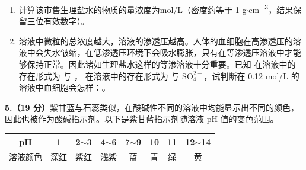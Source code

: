 \documentclass[11pt,a4paper]{article}
\begin{document}
\begin{enumerate}[label=（\arabic*）]
\item 计算该市售生理盐水的物质的量浓度为\blank[3.5em]mol/L（密度约等于 1 g$\cdot$cm\textsuperscript{$-$3}，结果保留三位有效数字）。

\item 溶液中微粒的总浓度越大，溶液的渗透压越高。人体的血细胞在高渗透压的溶液中会失水皱缩，在低渗透压环境下会吸水膨胀，只有在等渗透压溶液中才能够保持正常。因此诸如生理盐水这样的等渗溶液十分重要。已知  在溶液中的存在形式为  与 ， 在溶液中的存在形式为  与 $\mathrm{SO_4^{2-}}$，试判断在 0.12 mol/L 的  溶液中血细胞会怎样：\blank[3em]。
\end{enumerate}


\noindent\textbf{5.（19 分）}紫甘蓝与石蕊类似，在酸碱性不同的溶液中均能显示出不同的颜色，因此也被作为酸碱指示剂。以下是紫甘蓝指示剂随溶液 pH 值的变色范围。

\begin{center}
\begin{tabular}{|c|c|c|c|c|c|c|c|}
\hline
\rule{0pt}{1.2em}pH & 1 & 2$\sim$3 & 4$\sim$6 & 7$\sim$9 & 10 & 11 & 12$\sim$14 \\
\hline
\rule{0pt}{1.2em}溶液颜色 & 深红 & 紫红 & 浅紫 & 蓝 & 青 & 绿 & 黄 \\
\hline
\end{tabular}
\end{center}
\end{document}
